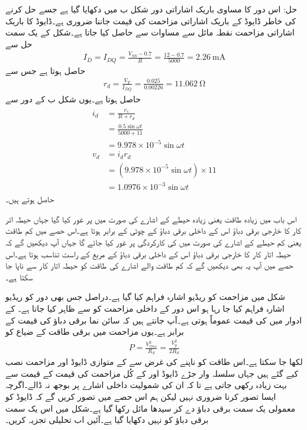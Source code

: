 حل:	اس دور کا مساوی باریک اشاراتی دور شکل  ب میں دکھایا گیا ہے جسے حل کرنے کی خاطر ڈایوڈ کے باریک اشاراتی مزاحمت   کی قیمت جاننا ضروری ہے۔ڈایوڈ کا باریک اشاراتی مزاحمت نقطہ مائل سے مساوات   سے حاصل کیا جاتا ہے۔شکل   کے یک سمت حل سے
\begin{align}
I_D=I_{DQ}=\frac{V_{SS}-0.7}{R}=\frac{12-0.7}{5000}=\SI{2.26}{\milli \ampere}
\end{align}
حاصل ہوتا ہے جس سے
\begin{align}
r_d = \frac{V_T}{I_{DQ}}=\frac{0.025}{0.00226}=\SI{11.062}{\ohm}
\end{align}
حاصل ہوتا ہے۔یوں شکل  ب کے دور سے 
\begin{gather}
\begin{aligned}
i_d &= \frac{v_s}{R+r_d} \\
&=\frac{0.5 \sin \omega t}{5000+11} \\
&=9.978 \times 10^{-5} \sin \omega t\\
v_d &=i_d r_d \\
&= (9.978 \times 10^{-5} \sin \omega t) \times 11 \\
&=1.0976 \times 10^{-3} \sin \omega t
\end{aligned}
\end{gather}
حاصل ہوتے ہیں۔

اس باب میں زیادہ طاقت یعنی زیادہ حیطے کے اشارے کی صورت میں  پر غور کیا گیا جہاں حیطہ اتر کار کا خارجی برقی دباؤ اس کے داخلی برقی دباؤ کے چوٹی کے برابر ہوتا ہے۔اس حصے میں کم طاقت یعنی کم حیطے کے اشارے کی صورت  میں  کی کارکردگی پر غور کیا جائے گا جہاں آپ دیکھیں گے کہ حیطہ اتار کار کا خارجی برقی دباؤ اس کے داخلی برقی دباؤ کے مربع کے راست تناسب ہوتا ہے۔اس حصے میں آپ یہ بھی دیکھیں گے کہ کم طاقت والے اشارے کی طاقت کو حیطہ اتار کار سے ناپا جا سکتا ہے۔ 

شکل  میں مزاحمت  کو ریڈیو اشارہ  فراہم کیا گیا ہے۔دراصل جس بھی دور کو ریڈیو اشارہ فراہم کیا جا رہا ہو اس دور کے داخلی مزاحمت کو  سے ظاہر کیا جاتا ہے۔ کے ادوار میں  کی قیمت عموماً  ہوتی ہے۔آپ جانتے ہیں کہ سائن نما برقی دباؤ  کی  قیمت  کے برابر ہے۔یوں مزاحمت  میں برقی طاقت کے ضیاع  کو
\begin{align}\label{مساوات_ڈایوڈ_ذرائع_ابلاغ_طاقت_کا_ناپ}
P=\frac{V^2_{rms}}{R_S}=\frac{V_p^2}{2R_S}
\end{align}
لکھا جا سکتا ہے۔اس طاقت کو ناپنے کی غرض سے  کے متوازی ڈایوڈ اور مزاحمت  نصب کیے گئے ہیں جہاں سلسلہ وار جڑے ڈایوڈ اور  کے کُل مزاحمت کی قیمت  کے قیمت سے بہت زیادہ رکھی جاتی ہے تا کہ ان کی شمولیت داخلی اشارے پر بوجھ نہ ڈالے۔اگرچہ ایسا تصور کرنا ضروری نہیں لیکن ہم اس حصے میں تصور کریں گے کہ ڈایوڈ کو معمولی یک سمت برقی دباؤ دے کر سیدھا مائل رکھا گیا ہے۔شکل میں اس یک سمت برقی دباؤ کو نہیں دکھایا گیا ہے۔آئیں اب  تحلیلی تجزیہ کریں۔

